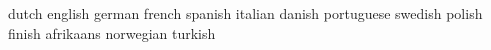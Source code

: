 \startinterface dutch      \appendtoks \language[\s!nl]\to \everyjob \stopinterface
\startinterface english    \appendtoks \language[\s!en]\to \everyjob \stopinterface
\startinterface german     \appendtoks \language[\s!de]\to \everyjob \stopinterface
\startinterface french     \appendtoks \language[\s!fr]\to \everyjob \stopinterface
\startinterface spanish    \appendtoks \language[\s!sp]\to \everyjob \stopinterface
\startinterface italian    \appendtoks \language[\s!it]\to \everyjob \stopinterface
\startinterface danish     \appendtoks \language[\s!da]\to \everyjob \stopinterface
\startinterface portuguese \appendtoks \language[\s!pt]\to \everyjob \stopinterface
\startinterface swedish    \appendtoks \language[\s!sv]\to \everyjob \stopinterface
\startinterface polish     \appendtoks \language[\s!pl]\to \everyjob \stopinterface
\startinterface finish     \appendtoks \language[\s!fi]\to \everyjob \stopinterface
\startinterface afrikaans  \appendtoks \language[\s!af]\to \everyjob \stopinterface
\startinterface norwegian  \appendtoks \language[\s!no]\to \everyjob \stopinterface
\startinterface turkish    \appendtoks \language[\s!tr]\to \everyjob \stopinterface

\appendtoks \mainlanguage[\currentlanguage] \to \everyjob

\protect

\endinput
